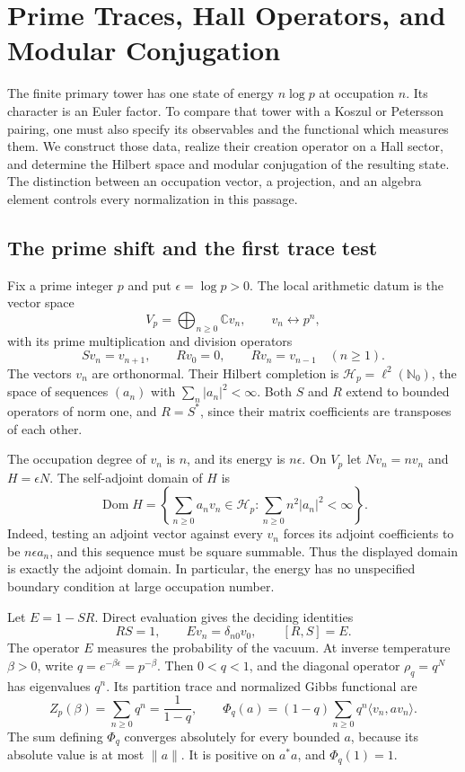 \chapter{Prime Traces, Hall Operators, and Modular Conjugation}
\label{v4-arith:thermal:chapter}

The finite primary tower has one state of energy $n\log p$ at
occupation $n$. Its character is an Euler factor. To compare that
tower with a Koszul or Petersson pairing, one must also specify
its observables and the functional which measures them. We
construct those data, realize their creation operator on a Hall
sector, and determine the Hilbert space and modular conjugation
of the resulting state. The distinction between an occupation
vector, a projection, and an algebra element controls every
normalization in this passage.

\section{The prime shift and the first trace test}

Fix a prime integer $p$ and put $\epsilon=\log p>0$. The local
arithmetic datum is the vector space
\[
 V_p=\bigoplus_{n\geq0}\mathbb C v_n,
 \qquad v_n\leftrightarrow p^n,
\]
with its prime multiplication and division operators
\[
 Sv_n=v_{n+1},\qquad Rv_0=0,\qquad Rv_n=v_{n-1}\quad(n\geq1).
\]
The vectors $v_n$ are orthonormal. Their Hilbert completion is
$\mathscr H_p=\ell^2(\mathbb N_0)$, the space of sequences
$(a_n)$ with $\sum_n|a_n|^2<\infty$. Both $S$ and $R$ extend to
bounded operators of norm one, and $R=S^*$, since their matrix
coefficients are transposes of each other.

The occupation degree of $v_n$ is $n$, and its energy is
$n\epsilon$. On $V_p$ let $Nv_n=nv_n$ and $H=\epsilon N$.
The self-adjoint domain of $H$ is
\[
 \operatorname{Dom}H
 =\left\{\sum_{n\geq0}a_nv_n\in\mathscr H_p:
                  \sum_{n\geq0}n^2|a_n|^2<\infty\right\}.
\]
Indeed, testing an adjoint vector against every $v_n$ forces its
adjoint coefficients to be $n\epsilon a_n$, and this sequence must
be square summable. Thus the displayed domain is exactly the
adjoint domain. In particular, the energy has no unspecified
boundary condition at large occupation number.

Let $E=1-SR$. Direct evaluation gives the deciding identities
\begin{equation}
 RS=1,\qquad Ev_n=\delta_{n0}v_0,\qquad [R,S]=E.
 \label{v4-arith:thermal:eq:vacuum-commutator}
\end{equation}
The operator $E$ measures the probability of the vacuum.
At inverse temperature $\beta>0$, write $q=e^{-\beta\epsilon}=p^{-\beta}$.
Then $0<q<1$, and the diagonal operator $\rho_q=q^N$ has eigenvalues
$q^n$. Its partition trace and normalized Gibbs functional are
\begin{equation}
 Z_p(\beta)=\sum_{n\geq0}q^n=\frac1{1-q},\qquad
 \Phi_q(a)=(1-q)\sum_{n\geq0}q^n\langle v_n,av_n\rangle.
 \label{v4-arith:thermal:eq:gibbs-definition}
\end{equation}
The sum defining $\Phi_q$ converges absolutely for every bounded $a$,
because its absolute value is at most $\|a\|$. It is positive on
$a^*a$, and $\Phi_q(1)=1$.

